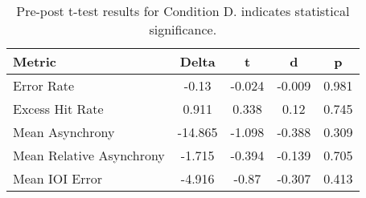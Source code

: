 
    \begin{table}[H]
    \centering
    \begin{small}
    \begin{tabular}{lcccc}
\toprule
Metric & Delta & t & d & p \\
\midrule
Error Rate & -0.13 & -0.024 & -0.009 & 0.981 \\
Excess Hit Rate & 0.911 & 0.338 & 0.12 & 0.745 \\
Mean Asynchrony & -14.865 & -1.098 & -0.388 & 0.309 \\
Mean Relative Asynchrony & -1.715 & -0.394 & -0.139 & 0.705 \\
Mean IOI Error & -4.916 & -0.87 & -0.307 & 0.413 \\
\bottomrule
\end{tabular}

    \end{small}
    \caption[Pre-post t-test results for Condition D]{Pre-post t-test results for Condition D. \newline * indicates statistical significance.}
    \label{tab:PrePost_D}
    \end{table}